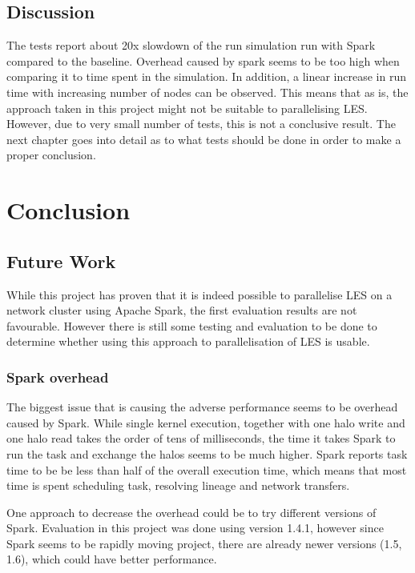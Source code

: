 \documentclass{l4proj}
\begin{document}
\section{Discussion}

The tests report about 20x slowdown of the run simulation run with Spark compared to
the baseline. Overhead caused by spark seems to be too high when comparing it to time spent 
in the simulation. In addition, a linear increase in run time with increasing number of nodes
can be observed. This means that as is, the approach taken in this project might not
be suitable to parallelising LES. However, due to very small number of tests, 
this is not a conclusive result. The next chapter goes into detail as to what tests
should be done in order to make a proper conclusion.

\chapter{Conclusion}
\label{chap:conclusion}

\section{Future Work}

While this project has proven that it is indeed possible to parallelise LES
on a network cluster using Apache Spark, the first evaluation results are
not favourable. However there is still some testing and evaluation to be done
to determine whether using this approach to parallelisation of LES is usable.

\subsection{Spark overhead}

The biggest issue that is causing the adverse performance seems to be overhead
caused by Spark. While single kernel execution, together with one halo write and
one halo read takes the order of tens of milliseconds, the time it takes Spark
to run the task and exchange the halos seems to be much higher. Spark reports
task time to be be less than half of the overall execution time, which means
that most time is spent scheduling task, resolving lineage and network transfers.

One approach to decrease the overhead could be to try different versions of Spark.
Evaluation in this project was done using version 1.4.1, however since Spark 
seems to be rapidly moving project, there are already newer versions (1.5, 1.6), which could have 
better performance.
\end{document}
